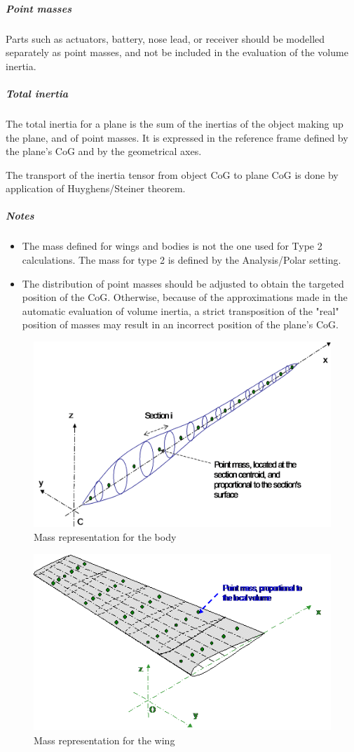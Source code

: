\documentclass[a4paper,twoside,12pt,dvips]{article}
\begin{document}
\subparagraph{Point masses}

Parts such as actuators, battery, nose lead, or receiver should be
modelled separately as point masses, and not be included in the
evaluation of the volume inertia.

\subparagraph{Total inertia}

The total inertia for a plane is the sum of the inertias of the object
making up the plane, and of point masses. It is expressed in the
reference frame defined by the plane's CoG and by the geometrical
axes.

The transport of the inertia tensor from object CoG to plane CoG is
done by application of Huyghens/Steiner theorem.

\subparagraph{Notes}

\begin{itemize}
\item The mass defined for wings and bodies is not the one used for
Type 2 calculations. The mass for type 2 is defined by the
Analysis/Polar setting.
\item The distribution of point masses should be adjusted to obtain
the targeted position of the CoG. Otherwise, because of the
approximations made in the automatic evaluation of volume inertia, a
strict transposition of the "real" position of masses may result in
an incorrect position of the plane's CoG.
\end{itemize}

\begin{figure}[htbp]
  \includegraphics[width=0.8\linewidth]{img-47}\centering 
  \caption{Mass representation for the body}
  \label{fig:mass_representation_for_the_body}
\end{figure}

\begin{figure}[htbp]
  \includegraphics[width=0.8\linewidth]{img-48}\centering 
  \caption{Mass representation for the wing}
  \label{fig:mass_representation_for_the_wing}
\end{figure}
\end{document}
